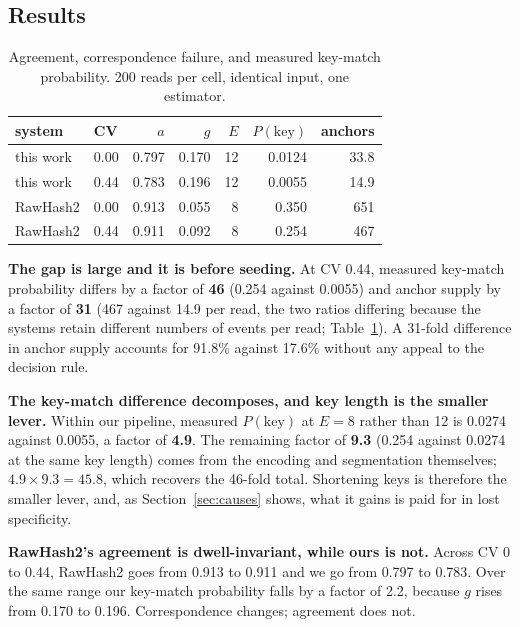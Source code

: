 \documentclass[runningheads]{llncs}
\begin{document}
\subsection{Results}

\begin{table}[t]
\caption{Agreement, correspondence failure, and measured key-match probability. 200 reads per
cell, identical input, one estimator.}
\label{tab:agree}
\centering
\scriptsize
\begin{tabular}{llrrrrr}
\toprule
system & CV & $a$ & $g$ & $E$ & $P(\mathrm{key})$ & anchors \\
\midrule
this work & 0.00 & 0.797 & 0.170 & 12 & 0.0124 & 33.8 \\
this work & 0.44 & 0.783 & 0.196 & 12 & 0.0055 & 14.9 \\
RawHash2  & 0.00 & 0.913 & 0.055 & 8  & 0.350  & 651 \\
RawHash2  & 0.44 & 0.911 & 0.092 & 8  & 0.254  & 467 \\
\bottomrule
\end{tabular}
\end{table}

\textbf{The gap is large and it is before seeding.} At CV 0.44, measured key-match probability
differs by a factor of \textbf{46} (0.254 against 0.0055) and anchor supply by a factor of
\textbf{31} (467 against 14.9 per read, the two ratios differing because the systems retain
different numbers of events per read; Table~\ref{tab:agree}). A 31-fold
difference in anchor supply accounts for 91.8\% against 17.6\% without any appeal to the
decision rule.

\textbf{The key-match difference decomposes, and key length is the smaller lever.} Within our
pipeline, measured $P(\mathrm{key})$ at $E = 8$ rather than 12 is 0.0274 against 0.0055, a
factor of \textbf{4.9}. The remaining factor of \textbf{9.3} (0.254 against 0.0274 at the same
key length) comes from the encoding and segmentation themselves; $4.9 \times 9.3 = 45.8$, which
recovers the 46-fold total. Shortening keys is therefore the smaller lever, and, as
Section~\ref{sec:causes} shows, what it gains is paid for in lost specificity.

\textbf{RawHash2's agreement is dwell-invariant, while ours is not.} Across CV 0 to 0.44,
RawHash2 goes from 0.913 to 0.911 and we go from 0.797 to 0.783. Over the same range our
key-match probability falls by a factor of 2.2, because $g$ rises from 0.170 to 0.196.
Correspondence changes; agreement does not.
\end{document}
